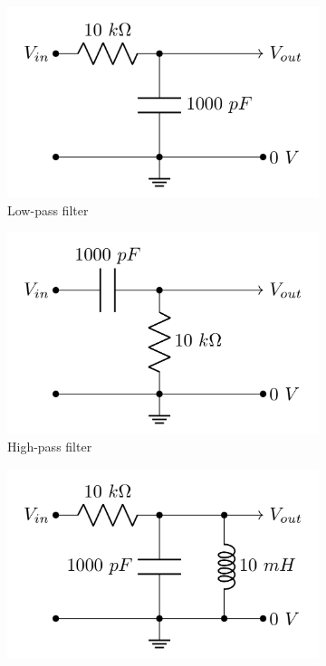 \documentclass[10pt]{PhysLab1C} %
\begin{document}
\begin{figure}[h]
     \centering
     \begin{subfigure}[b]{0.3\textwidth}
         \centering
         \includegraphics[width=\textwidth]{lab3fig/low-pass-1.png}
         \caption{Low-pass filter}
         \label{low-pass-1}
     \end{subfigure}
     \hfill
     \begin{subfigure}[b]{0.3\textwidth}
         \centering
         \includegraphics[width=\textwidth]{lab3fig/high-pass-1.png}
         \caption{High-pass filter}
         \label{high-pass-1}
     \end{subfigure}
     \hfill
     \begin{subfigure}[b]{0.3\textwidth}
         \centering
         \includegraphics[width=\textwidth]{lab3fig/band-pass-1.png}

\end{subfigure}
\end{figure}
\end{document}
